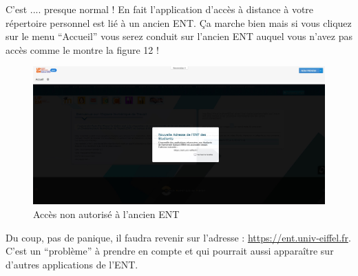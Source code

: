 \documentclass{article}
\begin{document}
\begin{exercice}
C'est .... presque normal ! En fait l'application d'accès à distance à votre répertoire personnel est lié à un ancien ENT. \c Ca marche bien mais si vous cliquez sur le menu ``Accueil'' vous serez conduit sur l'ancien ENT auquel vous n'avez pas accès comme le montre la figure 12 ! 

\begin{figure}[h!]
    \begin{center}
    \includegraphics[scale=0.25]{MesFichiersAccueil.jpg}
    \caption{Accès non autorisé à l'ancien ENT}
     \end{center}
\end{figure}    

Du coup, pas de panique, il faudra revenir sur l'adresse : \url{https://ent.univ-eiffel.fr}. C'est un ``problème'' à prendre en compte et qui pourrait aussi apparaître sur d'autres applications de l'ENT.

\newpage

\end{exercice}
\end{document}
